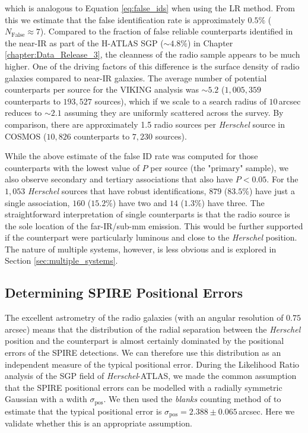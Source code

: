 \noindent which is analogous to Equation \ref{eq:false_ids} when using the LR method. From this we estimate that the false identification rate is approximately $0.5\%$ ($N_\textrm{False} \approx 7$). Compared to the fraction of false reliable counterparts identified in the near-IR as part of the H-ATLAS SGP ($\sim 4.8\%$) in Chapter \ref{chapter:Data_Release_3}, the cleanness of the radio sample appears to be much higher. One of the driving factors of this difference is the surface density of radio galaxies compared to near-IR galaxies. The average number of potential counterparts per source for the VIKING analysis was $\sim 5.2$ ($1,005,359$ counterparts to $193,527$ sources), which if we scale to a search radius of $10\,$arcsec reduces to $\sim 2.1$ assuming they are uniformly scattered across the survey. By comparison, there are approximately 1.5 radio sources per \textit{Herschel} source in COSMOS ($10,826$ counterparts to $7,230$ sources).

While the above estimate of the false ID rate was computed for those counterparts with the lowest value of $P$ per source (the "primary" sample), we also observe secondary and tertiary associations that also have $P < 0.05$. For the $1,053$ \textit{Herschel} sources that have robust identifications, $879$ ($83.5\%$) have just a single association, $160$ ($15.2\%$) have two and $14$ ($1.3\%$) have three. The straightforward interpretation of single counterparts is that the radio source is the sole location of the far-IR/sub-mm emission. This would be further supported if the counterpart were particularly luminous and close to the \textit{Herschel} position. The nature of multiple systems, however, is less obvious and is explored in Section \ref{sec:multiple_systems}.

\subsection{Determining SPIRE Positional Errors}

The excellent astrometry of the radio galaxies (with an angular resolution of $0.75\,$arcsec) means that the distribution of the radial separation between the \textit{Herschel} position and the counterpart is almost certainly dominated by the positional errors of the SPIRE detections. We can therefore use this distribution as an independent measure of the typical positional error. During the Likelihood Ratio analysis of the SGP field of \textit{Herschel}-ATLAS, we made the common assumption that the SPIRE positional errors can be modelled with a radially symmetric Gaussian with a wdith $\sigma_\textrm{pos}$. We then used the \textit{blanks} counting method of \citealt{Fleuren_2012} to estimate that the typical positional error is $\sigma_\textrm{pos} = 2.388\pm0.065\,$arcsec. Here we validate whether this is an appropriate assumption.

